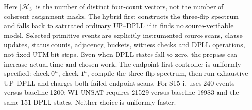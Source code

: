 \documentclass[11pt]{article}
\begin{document}
\begin{center}\small
{}
\end{center}
Here $|\mathcal H_3|$ is the number of distinct four-count vectors, not the number of coherent assignment masks. The hybrid first constructs the three-flip spectrum and falls back to saturated ordinary UP--DPLL if it finds no source-verifiable model. Selected primitive events are explicitly instrumented source scans, clause updates, status counts, adjacency, buckets, witness checks and DPLL operations, not fixed-UTM bit steps. Even when DPLL states fall to zero, the prepass can increase actual time and chosen work. The endpoint-first controller is uniformly specified: check $0^n$, check $1^n$, compile the three-flip spectrum, then run exhaustive UP--DPLL and charges both failed endpoint scans. For S15 it uses 240 events versus baseline 1200; W1 UNSAT requires 21529 versus baseline 19983 and the same 151 DPLL states. Neither choice is uniformly faster.
\end{document}
